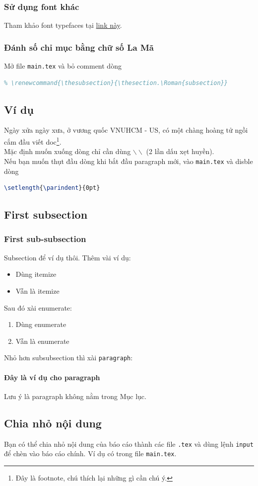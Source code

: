 \subsubsection{Sử dụng font khác}
Tham khảo font typefaces tại \href{https://www.overleaf.com/learn/latex/Font_typefaces}{link này}.

\subsubsection{Đánh số chỉ mục bằng chữ số La Mã}
Mở file \texttt{main.tex} và bỏ comment dòng 
\begin{lstlisting}[language=tex]
% \renewcommand{\thesection}{\Roman{section}}
% \renewcommand{\thesubsection}{\thesection.\Roman{subsection}}  
\end{lstlisting}

\subsection{Ví dụ}
Ngày xửa ngày xưa, ở vương quốc VNUHCM - US, có một chàng hoàng tử ngồi cắm đầu viết doc\footnote{Đây là footnote, chú thích lại những gì cần chú ý.}.\\
Mặc định muốn xuống dòng chỉ cần dùng $\backslash\backslash$  (2 lần dấu xẹt huyền).\\
Nếu bạn muốn thụt đầu dòng khi bắt đầu paragraph mới, vào \texttt{main.tex} và disble dòng
\begin{lstlisting}[language=tex]
\setlength{\parindent}{0pt}
\end{lstlisting}

\subsection{First subsection}
\subsubsection{First sub-subsection}
Subsection để ví dụ thôi. Thêm vài ví dụ:
\begin{itemize}
    \item Dùng itemize
    \item Vẫn là itemize
\end{itemize}
Sau đó xài enumerate:
\begin{enumerate}
    \item Dùng enumerate
    \item Vẫn là enumerate
\end{enumerate}
Nhỏ hơn subsubsection thì xài \texttt{paragraph}:

\paragraph{Đây là ví dụ cho paragraph}
Lưu ý là paragraph không nằm trong Mục lục.

\subsection{Chia nhỏ nội dung}
Bạn có thể chia nhỏ nội dung của báo cáo thành các file \texttt{.tex} và dùng lệnh \texttt{input} để chèn vào báo cáo chính. Ví dụ có trong file \texttt{main.tex}.